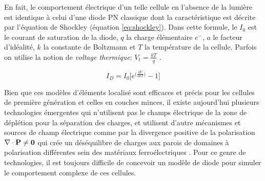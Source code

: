 En fait, le comportement électrique d'un telle cellule en l'absence de la lumière est identique à celui d'une diode PN classique dont la caractéristique est décrite par l'équation de Shockley (équation \ref{eq:shockley}). Dans cette formule, le $I_0$  est le courant de saturation de la diode, $q$  la charge élémentaire $e^{-}$, $a$ le facteur d'idéalité, $k$ la constante de Boltzmann  et $T$  la température de la cellule. Parfois on utilise la notion de \textit{voltage thermique}: $V_t = \frac{kT}{q}$ .

\begin{equation}
\label{eq:shockley}
  I_D = I_0 \bigg[e^{\big(\frac{qV}{akT}\big)} - 1\bigg]
\end{equation}

Bien que ces modèles d'éléments localisé sont efficaces et précis pour les cellules de première génération et celles en couches minces, il existe aujourd'hui plusieurs technologies émergentes qui n'utilisent pas le champs électrique de la zone de déplétion pour la séparation des charges, et utilisent d'autre mécanismes et sources de champ électrique comme par la divergence positive de la polarisation $\nabla \cdot \bf{P} \neq 0$ qui crée un déséquilibre de charges aux parois de domaines à polarisation différentes sein des matériaux ferroélectriques \cite{Huang2010}. Pour ce genre de technologies, il est toujours difficile de concevoir un modèle de diode pour simuler le comportement complexe de ces cellules.



